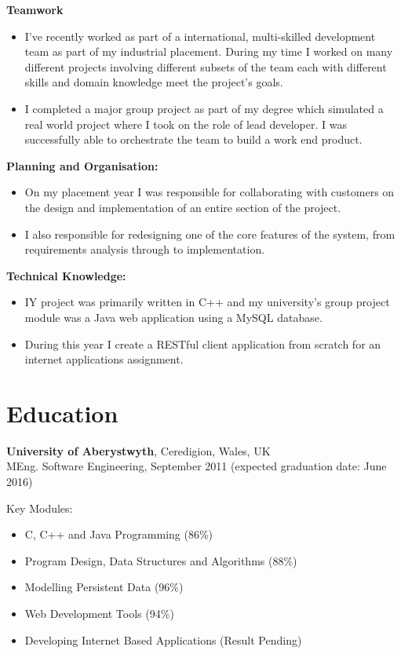 \documentclass[margin,line]{res}
\begin{document}
\begin{resume}
{\bf Teamwork}
\begin{itemize}
\item I've recently worked as part of a international, multi-skilled development team as part of my industrial placement. During my time I worked on many different projects involving different subsets of the team each with different skills and domain knowledge meet the project's goals. 
\item I completed a major group project as part of my degree which simulated a real world project where I took on the role of lead developer. I was successfully able to orchestrate the team to build a work end product.
\end{itemize}

{\bf Planning and Organisation:} 
\begin{itemize}
\item On my placement year I was responsible for collaborating with customers on the design and implementation of an entire section of the project. 
\item I also responsible for redesigning one of the core features of the system, from requirements analysis through to implementation.
\end{itemize}

{\bf Technical Knowledge:} 
\begin{itemize}
\item IY project was primarily written in C++ and my university's group project module was a Java web application using a MySQL database. 
\item During this year I create a RESTful client application from scratch for an internet applications assignment.
\end{itemize} 

\section{\sc Education}
{\bf University of Aberystwyth}, Ceredigion, Wales, UK\\
MEng. Software Engineering, September 2011 (expected graduation date: June 2016)

Key Modules:
\begin{itemize}

\item C, C++ and Java Programming (86\%)
\item Program Design, Data Structures and Algorithms (88\%)
\item Modelling Persistent Data (96\%)
\item Web Development Tools (94\%)
\item Developing Internet Based Applications (Result Pending)
\end{itemize}


\end{resume}
\end{document}
